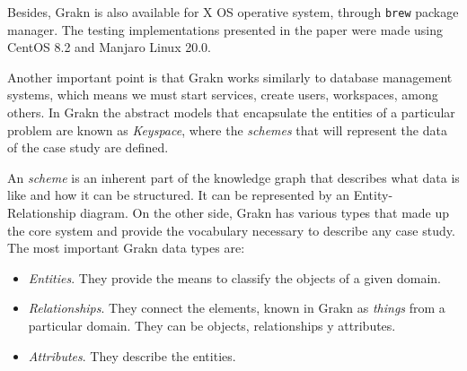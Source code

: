 Besides, Grakn is also available for X OS operative system,  through 
\texttt{brew} package manager. The testing implementations presented in the 
paper were made using CentOS 8.2 and Manjaro Linux 20.0.

Another important point is that Grakn works similarly to database management 
systems, which means we must start services, create users, workspaces, 
among others. In Grakn the abstract models that encapsulate 
the entities of a particular problem are known as \textit{Keyspace}, where the 
\textit{schemes} that will represent the data of the case study are defined.

An \textit{scheme} is an inherent part of the knowledge graph that describes 
what data is like and how it can be structured. It can be represented by an 
Entity-Relationship diagram. On the other side, Grakn has various types that 
made up the core system and provide the vocabulary necessary to describe any 
case study. The most important Grakn data types are:

\begin{itemize}
    \item \textit{Entities}. They provide the means to classify the objects of 
    a given domain.
    \item \textit{Relationships}. They connect the elements, known in Grakn as 
        \textit{things} from a particular domain. They can be objects, 
        relationships y attributes.
    \item \textit{Attributes}. They describe the entities.
\end{itemize}

